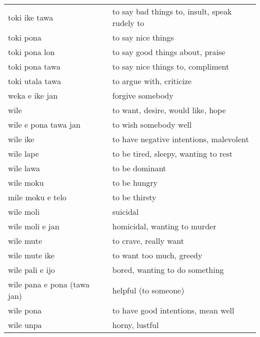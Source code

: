 \begin{supertabular}{p{4,5cm}|ll}
    toki ike tawa               &  & to say bad things to, insult, speak rudely to                      \\
    toki pona                   &  & to say nice things                                                 \\
    toki pona lon               &  & to say good things about, praise                                   \\
    toki pona tawa              &  & to say nice things to, compliment                                  \\
    toki utala tawa             &  & to argue with, criticize                                           \\
    weka e ike jan              &  & forgive somebody                                                   \\
    wile                        &  & to want, desire, would like, hope                                  \\
    wile e pona tawa jan        &  & to wish somebody well                                              \\
    wile ike                    &  & to have negative intentions, malevolent                            \\
    wile lape                   &  & to be tired, sleepy, wanting to rest                               \\
    wile lawa                   &  & to be dominant                                                     \\
    wile moku                   &  & to be hungry                                                       \\
    mile moku e telo            &  & to be thirsty                                                      \\
    wile moli                   &  & suicidal                                                           \\
    wile moli e jan             &  & homicidal, wanting to murder                                       \\
    wile mute                   &  & to crave, really want                                              \\
    wile mute ike               &  & to want too much, greedy                                           \\
    wile pali e ijo             &  & bored, wanting to do something                                     \\
    wile pana e pona (tawa jan) &  & helpful (to someone)                                               \\
    wile pona                   &  & to have good intentions, mean well                                 \\
    wile unpa                   &  & horny, lustful                                                     \\
\end{supertabular} \\

